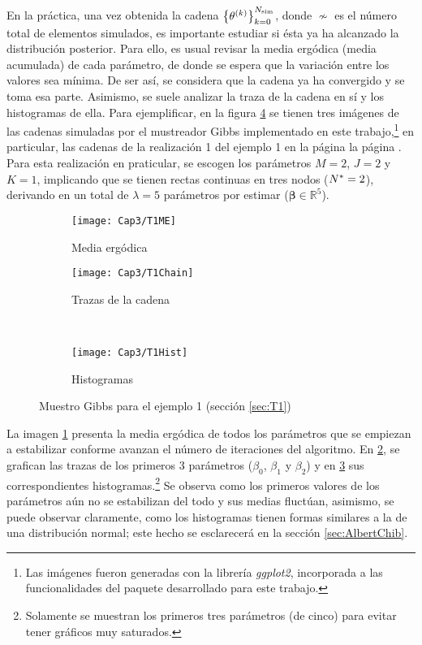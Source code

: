 \documentclass[../Main/Main.tex]{subfiles}
\begin{document}
En la práctica, una vez obtenida la cadena $\left\{\theta^{(k)}\right\}_{k=0}^{N_{\text{sim}}}$, donde $\nsim$ es el número total de elementos simulados, es importante estudiar si ésta ya ha alcanzado la distribución posterior. Para ello, es usual revisar la media ergódica (media acumulada) de cada parámetro, de donde se espera que la variación entre los valores sea mínima. De ser así, se considera que la cadena ya ha convergido y se toma esa parte. Asimismo, se suele analizar la traza de la cadena en sí y los histogramas de ella. Para ejemplificar, en la figura \ref{fig:GibbsSamplerSimulado} se tienen tres imágenes de las cadenas simuladas por el mustreador Gibbs implementado en este trabajo,\footnote{Las imágenes fueron generadas con la librería \textit{ggplot2}, incorporada a las funcionalidades del paquete desarrollado para este trabajo.} en particular, las cadenas de la realización 1 del ejemplo 1 en la página la página \pageref{fig:T1M1}. Para esta realización en praticular, se escogen los parámetros $M = 2$, $J = 2$ y $K = 1$, implicando que se tienen rectas continuas en tres nodos ($N^* = 2$), derivando en un total de $\lambda = 5$ parámetros por estimar ($\bm{\beta}\in\mathbb{R}^5$). 
\begin{figure}[h]
    \centering
    \begin{subfigure}[b]{0.45\textwidth}
        \texttt{[image: Cap3/T1ME]}
        \caption{Media ergódica}
        \label{img:MedErg}
    \end{subfigure}
	\quad
    \begin{subfigure}[b]{0.45\textwidth}
        \texttt{[image: Cap3/T1Chain]}
        \caption{Trazas de la cadena}
        \label{img:GibbsChain}
    \end{subfigure}
	\\
    \centering
    \begin{subfigure}[b]{0.45\textwidth}
        \texttt{[image: Cap3/T1Hist]}
        \caption{Histogramas}
        \label{img:GibbsHist}
    \end{subfigure}
    \caption{Muestro Gibbs para el ejemplo 1 (sección \ref{sec:T1})}\label{fig:GibbsSamplerSimulado}
\end{figure}
La imagen \ref{img:MedErg} presenta la media ergódica de todos los parámetros que se empiezan a estabilizar conforme avanzan el número de iteraciones del algoritmo. En \ref{img:GibbsChain}, se grafican las trazas de los primeros 3 parámetros ($\beta_0$, $\beta_1$ y $\beta_2$) y en \ref{img:GibbsHist} sus correspondientes histogramas.\footnote{Solamente se muestran los primeros tres parámetros (de cinco) para evitar tener gráficos muy saturados.} Se observa como los primeros valores de los parámetros aún no se estabilizan del todo y sus medias fluctúan, asimismo, se puede observar claramente, como los histogramas tienen formas similares a la de una distribución normal; este hecho se esclarecerá en la sección \ref{sec:AlbertChib}. 
\end{document}
